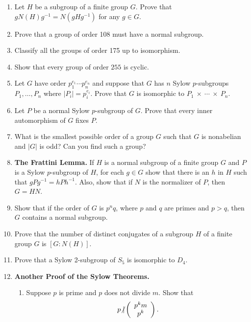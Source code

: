 {\begin{enumerate}
\item
Let $H$ be a subgroup of a finite group $G$. Prove that $g N(H) g^{-1}
= N(gHg^{-1})$ for any $g \in G$. 

\item
Prove that a group of order 108 must have a normal subgroup.

\item
Classify all the groups of order 175 up to isomorphism.

\item
Show that every group of order $255$ is cyclic.

\item
Let $G$ have order $p_1^{e_1} \cdots p_n^{e_n}$ and suppose that $G$
has $n$ Sylow \mbox{$p$-subgroups} $P_1, \ldots, P_n$ where 
$|P_i| = p_i^{e_i}$.  Prove that $G$ is isomorphic to 
$P_1~\times~\cdots~\times~P_n$. 
 
\item
Let $P$ be a normal Sylow $p$-subgroup of $G$.  Prove that every inner
automorphism of $G$ fixes $P$.  
 
 
\item
What is the smallest possible order of a group $G$ such that $G$ is
nonabelian and $|G|$ is odd?  Can you find such a group?
 
 
\item
{\bf The Frattini Lemma.}  
If $H$ is a normal subgroup of a finite group $G$ and $P$ is a Sylow
$p$-subgroup of $H$, for each $g \in G$ show that there is an $h$ in
$H$ such that $gPg^{-1} = hPh^{-1}$.  Also, show that if $N$ is the
normalizer of $P$, then $G= HN$. 
 
 
\item
Show that if the order of $G$ is $p^nq$, where $p$ and $q$ are primes
and $p>q$, then $G$ contains a normal subgroup. 
 
 
\item
Prove that the number of distinct conjugates of a subgroup $H$ of a 
finite group $G$ is $[G : N(H) ]$. 
 
 
\item
Prove that a Sylow 2-subgroup of $S_5$ is isomorphic to $D_4$.
 
 
\item
{\bf Another Proof of the Sylow Theorems.}
\begin{enumerate}
 
\item
Suppose $p$ is prime and $p$ does not divide $m$.  Show that
\[
p {\not{\mid}}
\left(
\begin{array}{c}
p^k m \\ p^k
\end{array}
\right).
\]
 

\end{enumerate}
\end{enumerate}}
